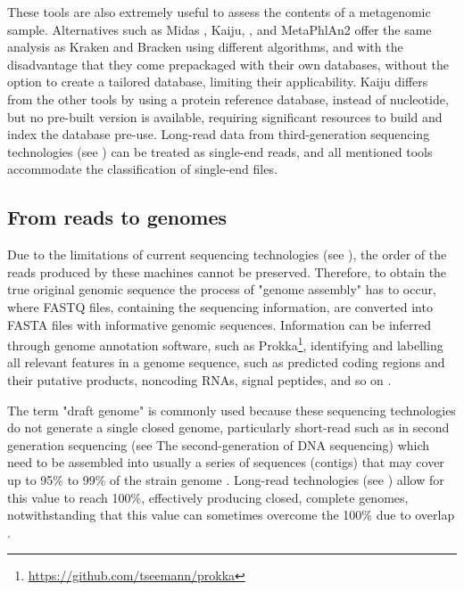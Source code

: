 These tools are also extremely useful to assess the contents of a metagenomic sample. Alternatives such as Midas \citep{nayfach_integrated_2016}, Kaiju, \citep{menzel_fast_2016}, and MetaPhlAn2 \citep{truong_metaphlan2_2015} offer the same analysis as Kraken and Bracken using different algorithms, and with the disadvantage that they come prepackaged with their own databases, without the option to create a tailored database, limiting their applicability. Kaiju differs from the other tools by using a protein reference database, instead of nucleotide, but no pre-built version is available, requiring significant resources to build and index the database pre-use. Long-read data from third-generation sequencing technologies (see ) can be treated as single-end reads, and all mentioned tools accommodate the classification of single-end files. 

\subsection{From reads to genomes} \label{ssec:_intro_reads_2_genomes}

Due to the limitations of current sequencing technologies (see ), the order of the reads produced by these machines cannot be preserved. 
Therefore, to obtain the true original genomic sequence the process of "genome assembly" has to occur, where FASTQ files, containing the sequencing information, are converted into FASTA files with informative genomic sequences. Information can be inferred through genome annotation software, such as Prokka\footnote{\url{https://github.com/tseemann/prokka}}, identifying and labelling all relevant features in a genome sequence, such as predicted coding regions and their putative products, noncoding \ac{RNA}s, signal peptides, and so on \citep{seemann_prokka_2014}. 


The term "draft genome" is commonly used because these sequencing technologies do not generate a single closed genome, particularly short-read such as in second generation sequencing (see  The second-generation of \ac{DNA} sequencing) which need to be assembled into usually a series of sequences (contigs) that may cover up to 95\% to 99\% of the strain genome \citep{carrico_primer_2018}. 
Long-read technologies (see ) allow for this value to reach 100\%, effectively producing closed, complete genomes, notwithstanding that this value can sometimes overcome the 100\% due to overlap \citep{wick_benchmarking_2021}.

